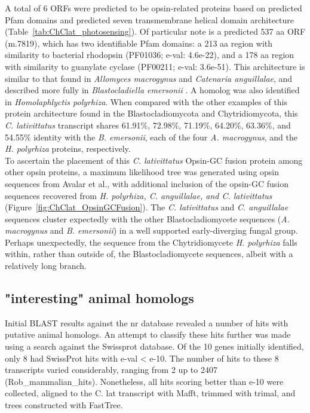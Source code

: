 \indent A total of 6 ORFs were predicted to be opsin-related proteins based on predicted Pfam domains and predicted seven transmembrane helical domain architecture (Table~\ref{tab:ChClat_photosensing}). Of particular note is a predicted 537 aa ORF (m.7819), which has two identifiable Pfam domains: a 213 aa region with similarity to bacterial rhodopsin (PF01036; e-val: 4.6e-22), and a 178 aa region with similarity to guanylate cyclase (PF00211; e-val: 3.6e-51). This architecture is similar to that found in \textit{Allomyces macrogynus} and \textit{Catenaria anguillalae}, and described more fully in \textit{Blastocladiella emersonii} \cite{Avelar2014}. A homolog was also identified in \textit{Homolaphlyctis polyrhiza}. When compared with the other examples of this protein architecture found in the Blastocladiomycota and Chytridiomycota, this \textit{C. lativittatus} transcript shares 61.91\%, 72.98\%, 71.19\%, 64.20\%, 63.36\%, and 54.55\% identity with the \textit{B. emersonii}, each of the four \textit{A. macrogynus}, and the \textit{H. polyrhiza} proteins, respectively.\\
\indent To ascertain the placement of this \textit{C. lativittatus} Opsin-GC fusion protein among other opsin proteins, a maximum likelihood tree was generated using opsin sequences from Avalar et al., with additional inclusion of the opsin-GC fusion sequences recovered from \textit{H. polyrhiza, C. anguillalae, and C. lativittatus} (Figure~\ref{fig:ChClat_OpsinGCFusion}). The \textit{C. lativittatus} and \textit{C. anguillalae} sequences cluster expectedly with the other Blastocladiomycete sequences (\textit{A. macrogynus} and \textit{B. emersonii}) in a well supported early-diverging fungal group. Perhaps unexpectedly, the sequence from the Chytridiomycete \textit{H. polyrhiza} falls within, rather than outside of, the Blastocladiomycete sequences, albeit with a relatively long branch.\\
\subsection*{"interesting" animal homologs}
Initial BLAST results against the nr database revealed a number of hits with putative animal homologs. An attempt to classify these hits further was made using a search against the Swissprot database. Of the 10 genes initially identified, only 8 had SwissProt hits with e-val < e-10. The number of hits to these 8 transcripts varied considerably, ranging from 2 up to 2407 (Rob\_mammalian\_hits). Nonetheless, all hits scoring better than e-10 were collected, aligned to the C. lat transcript with Mafft, trimmed with trimal, and trees constructed with FastTree.\\

